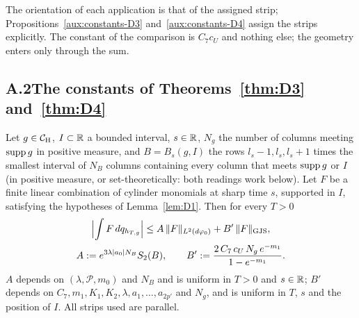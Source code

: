 The orientation of each application is that of the assigned strip;
Propositions~\ref{aux:constants-D3} and~\ref{aux:constants-D4} assign the strips explicitly.  The
constant of the comparison is $C_7c_U$ and nothing else; the geometry enters only through the
sum.

\subsection*{A.2\quad The constants of Theorems~\ref{thm:D3} and~\ref{thm:D4}}

\begin{auxprop}\label{aux:constants-D3}
Let $g\in\mathcal{C}_{\mathrm H}$, $I\subset\mathbb{R}$ a bounded interval, $s\in\mathbb{R}$, $N_g$ the number of columns meeting
$\operatorname{supp} g$ in positive measure, and $B=B_s(g,I)$ the rows $l_s-1,l_s,l_s+1$ times the smallest
interval of $N_B$ columns containing every column that meets $\operatorname{supp} g$ or $I$ (in positive
measure, or set-theoretically: both readings work below).  Let $F$ be a finite linear
combination of cylinder monomials at sharp time $s$, supported in $I$, satisfying the
hypotheses of Lemma~\ref{lem:D1}.  Then for every $T>0$
\[
\begin{gathered}
 \Bigl|\int F\,dq_{h_{T,g}}\Bigr|\le A\,\|F\|_{L^2(d\varphi_0)}+B'\,\lVert F\rVert_{\mathrm{GJS}},\\
 A:=e^{3\lambda|a_0|N_B}S_2(B),\qquad B':=\frac{2\,C_7\,c_U\,N_g\,e^{-m_1}}{1-e^{-m_1}} .
\end{gathered}
\]
$A$ depends on $(\lambda,\mathscr P,m_0)$ and $N_B$ and is uniform in $T>0$ and $s\in\mathbb{R}$;
$B'$ depends on $C_7,m_1,K_1,K_2,\lambda,a_1,\dots,a_{2p'}$ and $N_g$, and is uniform in $T$,
$s$ and the position of $I$.  All strips used are parallel.
\end{auxprop}

